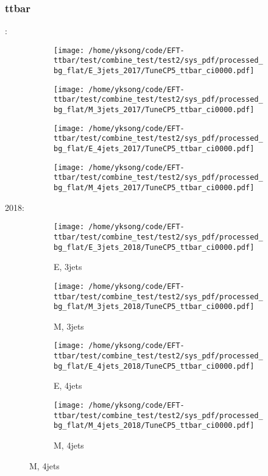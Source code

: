\documentclass{beamer}
\begin{document}
\begin{frame}
\frametitle{ttbar}
\fontsize{5}{1}:
\begin{figure}
\centering
\begin{subfigure}[b]{0.24\textwidth}
\texttt{[image: /home/yksong/code/EFT-ttbar/test/combine\_test/test2/sys\_pdf/processed\_bg\_flat/E\_3jets\_2017/TuneCP5\_ttbar\_ci0000.pdf]}
\end{subfigure}
\begin{subfigure}[b]{0.24\textwidth}
\texttt{[image: /home/yksong/code/EFT-ttbar/test/combine\_test/test2/sys\_pdf/processed\_bg\_flat/M\_3jets\_2017/TuneCP5\_ttbar\_ci0000.pdf]}
\end{subfigure}
\begin{subfigure}[b]{0.24\textwidth}
\texttt{[image: /home/yksong/code/EFT-ttbar/test/combine\_test/test2/sys\_pdf/processed\_bg\_flat/E\_4jets\_2017/TuneCP5\_ttbar\_ci0000.pdf]}
\end{subfigure}
\begin{subfigure}[b]{0.24\textwidth}
\texttt{[image: /home/yksong/code/EFT-ttbar/test/combine\_test/test2/sys\_pdf/processed\_bg\_flat/M\_4jets\_2017/TuneCP5\_ttbar\_ci0000.pdf]}
\end{subfigure}
\end{figure}
2018:
\begin{figure}
\centering
\begin{subfigure}[b]{0.24\textwidth}
\texttt{[image: /home/yksong/code/EFT-ttbar/test/combine\_test/test2/sys\_pdf/processed\_bg\_flat/E\_3jets\_2018/TuneCP5\_ttbar\_ci0000.pdf]}
\captionsetup{font=tiny}
\caption{E, 3jets}
\end{subfigure}
\begin{subfigure}[b]{0.24\textwidth}
\texttt{[image: /home/yksong/code/EFT-ttbar/test/combine\_test/test2/sys\_pdf/processed\_bg\_flat/M\_3jets\_2018/TuneCP5\_ttbar\_ci0000.pdf]}
\captionsetup{font=tiny}
\caption{M, 3jets}
\end{subfigure}
\begin{subfigure}[b]{0.24\textwidth}
\texttt{[image: /home/yksong/code/EFT-ttbar/test/combine\_test/test2/sys\_pdf/processed\_bg\_flat/E\_4jets\_2018/TuneCP5\_ttbar\_ci0000.pdf]}
\captionsetup{font=tiny}
\caption{E, 4jets}
\end{subfigure}
\begin{subfigure}[b]{0.24\textwidth}
\texttt{[image: /home/yksong/code/EFT-ttbar/test/combine\_test/test2/sys\_pdf/processed\_bg\_flat/M\_4jets\_2018/TuneCP5\_ttbar\_ci0000.pdf]}
\captionsetup{font=tiny}
\caption{M, 4jets}
\end{subfigure}
\end{figure}
\end{frame}
\end{document}
